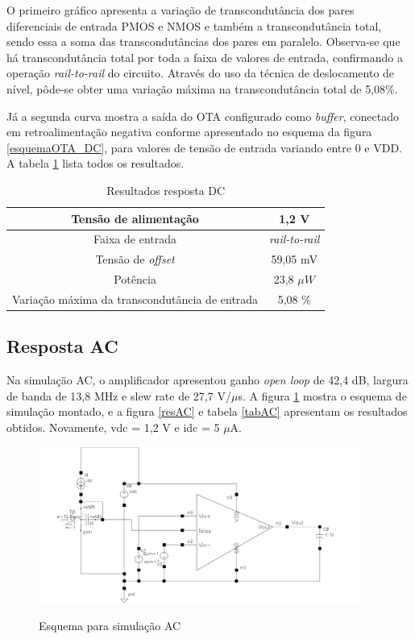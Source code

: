\documentclass[
	12pt,				%
	oneside,			%
	a4paper,			%
	english,			%
	french,				%
	spanish,			%
	brazil				%
	]{abntex2}
\begin{document}
O primeiro gráfico apresenta a variação de transcondutância dos pares diferenciais de entrada PMOS e NMOS e também a transcondutância total, sendo essa a soma das transcondutâncias dos pares em paralelo. Observa-se que há transcondutância total por toda a faixa de valores de entrada, confirmando a operação \textit{rail-to-rail} do circuito. Através do uso da técnica de deslocamento de nível, pôde-se obter uma variação máxima na transcondutância total de 5,08\%. 

Já a segunda curva mostra a saída do OTA configurado como \textit{buffer}, conectado em retroalimentação negativa conforme apresentado no esquema da figura \ref{esquemaOTA_DC}, para valores de tensão de entrada variando entre 0 e VDD. A tabela \ref{tabDC} lista todos os resultados. 

\begin{table}[h]
    \begin{center}    
    \begin{tabular}{ | c | c | }
    \hline
    Tensão de alimentação  & 1,2 V \\
    \hline
    Faixa de entrada  & \textit{rail-to-rail} \\ 
    \hline
    Tensão de \textit{offset}  & 59,05 mV \\
    \hline
    Potência  & 23,8 $\mu W $ \\
    \hline
    Variação máxima da transcondutância de entrada  & 5,08 \% \\
    \hline
    \end{tabular}
    \caption[Resultados resposta DC]{Resultados resposta DC}
    \label{tabDC}
    \end{center}
\end{table}

\subsection{Resposta AC}
Na simulação AC, o amplificador apresentou ganho \textit{open loop} de 42,4 dB, largura de banda de 13,8 MHz e slew rate de 27,7 V/$\mu$s. A figura \ref{esquemaOTA_AC} mostra o esquema de simulação montado, e a figura \ref{resAC} e tabela \ref{tabAC} apresentam os resultados obtidos. Novamente, vdc = 1,2 V e idc = 5 $\mu$A.

\begin{figure}[!ht]
  \centering
  \includegraphics[width=300pt]{esquemaOTA_AC.jpg}\\
  \caption{Esquema para simulação AC}\label{esquemaOTA_AC}
\end{figure}
\end{document}
